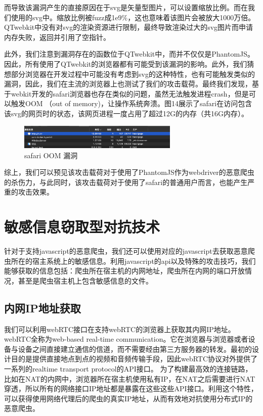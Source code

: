 \documentclass[doctor,privacy,twoside]{buaa_mac}
\begin{document}
而导致该漏洞产生的直接原因在于svg是矢量型图片，可以设置缩放比例。而在我们使用的svg中。缩放比例被fuzz成1e9\%，这也意味着该图片会被放大1000万倍。QTwebkit中没有对svg的渲染资源进行限制，最终导致渲染过大的svg图片而申请内存失败，返回并引用了空指针。

此外，我们注意到漏洞存在的函数位于QTwebkit中，而并不仅仅是PhantomJS。因此，所有使用了QTwebkit的浏览器都有可能受到该漏洞的影响。此外，我们猜想部分浏览器在开发过程中可能没有考虑到svg的这种特性，也有可能触发类似的漏洞，因此，我们在主流的浏览器上也测试了我们的攻击载荷。最终我们发现，基于webkit开发的safari浏览器也存在类似的问题，虽然无法触发进程crash，但是可以触发OOM （out of memory)，让操作系统奔溃。图14展示了safari在访问包含该svg的网页时的状态，该网页进程一度占用了超过12G的内存（共16G内存）。

\centerline{}
\begin{figure}[!h]
  \centering
  \includegraphics[width=0.68\textwidth]{images/safari_oom.jpg}
  \caption{safari OOM 漏洞}
  \label{fig:logo}
\end{figure}
\centerline{}

综上，我们可以预见该攻击载荷对于使用了PhantomJS作为webdriver的恶意爬虫的杀伤力，与此同时，该攻击载荷对于使用了safari的普通用户而言，也能产生严重的攻击效果。



\section{敏感信息窃取型对抗技术}

针对于支持javascript的恶意爬虫，我们还可以使用对应的javascript去获取恶意爬虫所在的宿主系统上的敏感信息。利用javascript的api以及特殊的攻击技巧，我们能够获取的信息包括：爬虫所在宿主机的内网地址，爬虫所在内网的端口开放情况，甚至是爬虫宿主机上包含敏感信息的文件。


\subsection{内网IP地址获取}
我们可以利用webRTC接口在支持webRTC的浏览器上获取其内网IP地址。webRTC全称为web-based real-time communication。它在浏览器与浏览器或者设备与设备之间直接建立通信的信道，而不需要经由第三方服务器的转发。最初的设计目的是提供直接地点到点的视频和音频传输手段，因此webRTC协议对外提供了一系列的realtime transport protocol的API接口。
为了构建最高效的连接链路，比如在NAT的内网中，浏览器所在宿主机使用私有IP，在NAT之后需要进行NAT穿透，所以所有的网络接口IP地址都是暴露在这些这些API接口。利用这个特性，可以获得使用网络代理后的爬虫的真实IP地址，从而有效地对抗使用分布式IP的恶意爬虫。
\end{document}

